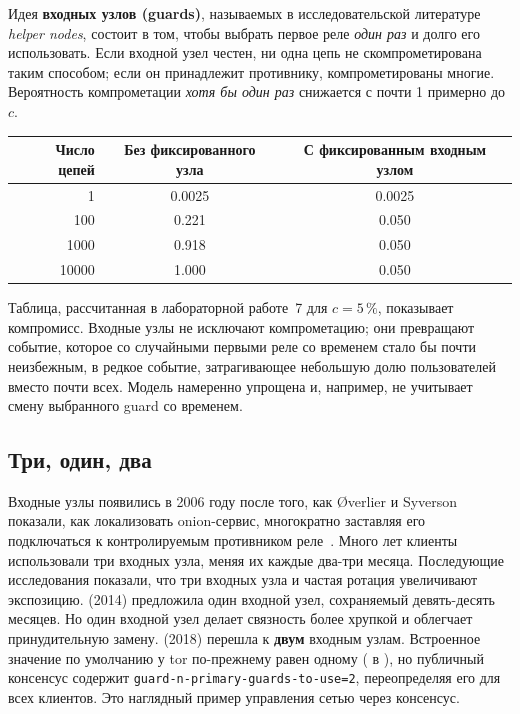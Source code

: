 Идея \textbf{входных узлов (guards)}, называемых в исследовательской литературе \emph{helper nodes}, состоит в том, чтобы выбрать первое реле \emph{один раз} и долго его использовать. Если входной узел честен, ни одна цепь не скомпрометирована таким способом; если он принадлежит противнику, компрометированы многие. Вероятность компрометации \emph{хотя бы один раз} снижается с почти 1 примерно до $c$.

\begin{center}
\begin{tabular}{rcc}
\toprule
Число цепей & Без фиксированного узла & С фиксированным входным узлом \\
\midrule
1 & 0.0025 & 0.0025 \\
100 & 0.221 & 0.050 \\
\num{1000} & 0.918 & 0.050 \\
\num{10000} & 1.000 & 0.050 \\
\bottomrule
\end{tabular}
\end{center}
\noindent Таблица, рассчитанная в лабораторной работе~7 для $c = 5\,\%$, показывает компромисс. Входные узлы не исключают компрометацию; они превращают событие, которое со случайными первыми реле со временем стало бы почти неизбежным, в редкое событие, затрагивающее небольшую долю пользователей вместо почти всех. Модель намеренно упрощена и, например, не учитывает смену выбранного guard со временем.

\subsection{Три, один, два}

Входные узлы появились в 2006 году после того, как Øverlier и Syverson показали, как локализовать onion-сервис, многократно заставляя его подключаться к контролируемым противником реле~\cite{overlier2006locating}. Много лет клиенты использовали три входных узла, меняя их каждые два-три месяца. Последующие исследования показали, что три входных узла и частая ротация увеличивают экспозицию.  (2014) предложила один входной узел, сохраняемый девять-десять месяцев. Но один входной узел делает связность более хрупкой и облегчает принудительную замену.  (2018) перешла к \textbf{двум} входным узлам. Встроенное значение по умолчанию у tor по-прежнему равен одному ( в ), но публичный консенсус содержит \texttt{guard-n-primary-guards-to-use=2}, переопределяя его для всех клиентов. Это наглядный пример управления сетью через консенсус.

